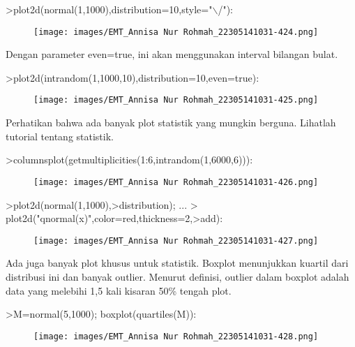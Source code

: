 \documentclass[a4paper,10pt]{article}
\begin{document}
\begin{eulernotebook}
\begin{eulercomment}
\end{eulercomment}
\begin{eulerprompt}
>plot2d(normal(1,1000),distribution=10,style="\(\backslash\)/"):
\end{eulerprompt}
\begin{figure}[h]
    \centering
    \texttt{[image: images/EMT\_Annisa Nur Rohmah\_22305141031-424.png]}
\end{figure}
\begin{eulercomment}
Dengan parameter even=true, ini akan menggunakan interval bilangan
bulat.
\end{eulercomment}
\begin{eulerprompt}
>plot2d(intrandom(1,1000,10),distribution=10,even=true):
\end{eulerprompt}
\begin{figure}[h]
    \centering
    \texttt{[image: images/EMT\_Annisa Nur Rohmah\_22305141031-425.png]}
\end{figure}
\begin{eulercomment}
Perhatikan bahwa ada banyak plot statistik yang mungkin berguna.
Lihatlah tutorial tentang statistik.
\end{eulercomment}
\begin{eulerprompt}
>columnsplot(getmultiplicities(1:6,intrandom(1,6000,6))):
\end{eulerprompt}
\begin{figure}[h]
    \centering
    \texttt{[image: images/EMT\_Annisa Nur Rohmah\_22305141031-426.png]}
\end{figure}
\begin{eulerprompt}
>plot2d(normal(1,1000),>distribution); ...
>  plot2d("qnormal(x)",color=red,thickness=2,>add):
\end{eulerprompt}
\begin{figure}[h]
    \centering
    \texttt{[image: images/EMT\_Annisa Nur Rohmah\_22305141031-427.png]}
\end{figure}
\begin{eulercomment}
Ada juga banyak plot khusus untuk statistik. Boxplot menunjukkan
kuartil dari distribusi ini dan banyak outlier. Menurut definisi,
outlier dalam boxplot adalah data yang melebihi 1,5 kali kisaran 50\%
tengah plot.
\end{eulercomment}
\begin{eulerprompt}
>M=normal(5,1000); boxplot(quartiles(M)):
\end{eulerprompt}
\begin{figure}[h]
    \centering
    \texttt{[image: images/EMT\_Annisa Nur Rohmah\_22305141031-428.png]}

\end{figure}
\end{eulernotebook}
\end{document}
